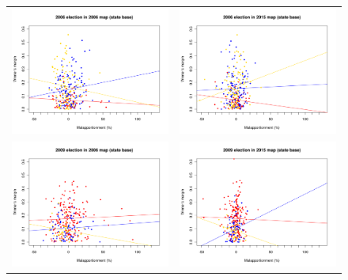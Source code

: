 \documentclass[letter,12pt]{article}
\begin{document}
\begin{figure}
\begin{center}
  \begin{tabular}{cc}
    \includegraphics[width=.4\columnwidth]{../graphs/malmg2006d0nat.pdf} & \includegraphics[width=.4\columnwidth]{../graphs/malmg2006d3nat.pdf} \\
    \includegraphics[width=.4\columnwidth]{../graphs/malmg2009d0nat.pdf} & \includegraphics[width=.4\columnwidth]{../graphs/malmg2009d3nat.pdf} \\

\end{tabular}
\end{center}
\end{figure}
\end{document}
